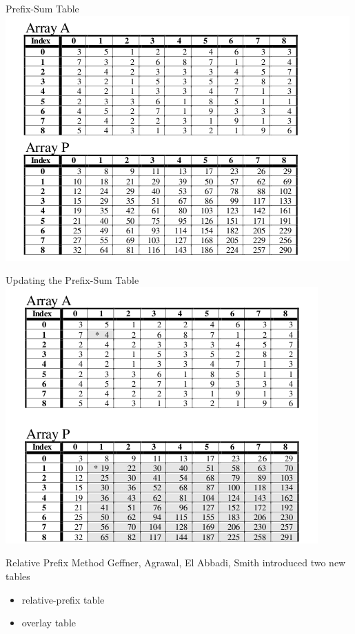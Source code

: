 \documentclass{beamer}
\theoremstyle{definition}
\theoremstyle{definition}
\begin{document}
\begin{frame}{Prefix-Sum Table}
\includegraphics[scale=0.5]{prefixtable.png}
\cite{Geffner99}
\end{frame}

\begin{frame}{Updating the Prefix-Sum Table}
\includegraphics[scale=0.5]{prefixupdate.png}
\cite{Geffner99}
\end{frame}

\begin{frame}{Relative Prefix Method}
Geffner, Agrawal, El Abbadi, Smith\cite{Geffner99}
introduced two new tables
\begin{itemize}
    \item relative-prefix table
    \item overlay table
\end{itemize}
\end{frame}
\end{document}
